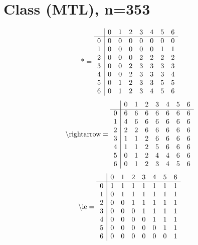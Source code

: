 \documentclass[11pt]{article}
\begin{document}
\section{Class (MTL), n=353}
\[\text{*} = 
\begin{array}{r | r r r r r r r}
 & 0 & 1 & 2 & 3 & 4 & 5 & 6 \\ \hline
0 & 0 & 0 & 0 & 0 & 0 & 0 & 0 \\
1 & 0 & 0 & 0 & 0 & 0 & 1 & 1 \\
2 & 0 & 0 & 0 & 2 & 2 & 2 & 2 \\
3 & 0 & 0 & 2 & 3 & 3 & 3 & 3 \\
4 & 0 & 0 & 2 & 3 & 3 & 3 & 4 \\
5 & 0 & 1 & 2 & 3 & 3 & 5 & 5 \\
6 & 0 & 1 & 2 & 3 & 4 & 5 & 6 \\
\end{array}
\]
\[\text{\textbackslash rightarrow} = 
\begin{array}{r | r r r r r r r}
 & 0 & 1 & 2 & 3 & 4 & 5 & 6 \\ \hline
0 & 6 & 6 & 6 & 6 & 6 & 6 & 6 \\
1 & 4 & 6 & 6 & 6 & 6 & 6 & 6 \\
2 & 2 & 2 & 6 & 6 & 6 & 6 & 6 \\
3 & 1 & 1 & 2 & 6 & 6 & 6 & 6 \\
4 & 1 & 1 & 2 & 5 & 6 & 6 & 6 \\
5 & 0 & 1 & 2 & 4 & 4 & 6 & 6 \\
6 & 0 & 1 & 2 & 3 & 4 & 5 & 6 \\
\end{array}
\]
\[\text{\textbackslash le} = 
\begin{array}{r | r r r r r r r}
 & 0 & 1 & 2 & 3 & 4 & 5 & 6 \\ \hline
0 & 1 & 1 & 1 & 1 & 1 & 1 & 1 \\
1 & 0 & 1 & 1 & 1 & 1 & 1 & 1 \\
2 & 0 & 0 & 1 & 1 & 1 & 1 & 1 \\
3 & 0 & 0 & 0 & 1 & 1 & 1 & 1 \\
4 & 0 & 0 & 0 & 0 & 1 & 1 & 1 \\
5 & 0 & 0 & 0 & 0 & 0 & 1 & 1 \\
6 & 0 & 0 & 0 & 0 & 0 & 0 & 1 \\
\end{array}
\]
\end{document}
